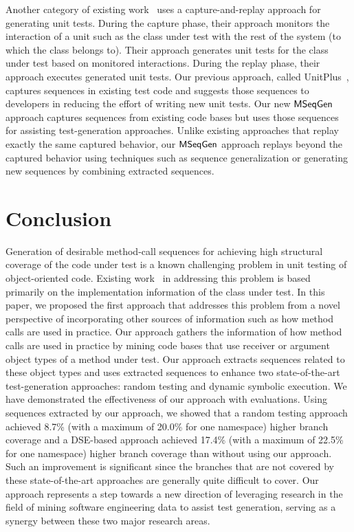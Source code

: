 \documentclass{sig-alternate}
\begin{document}
Another category of existing work~\cite{Elbaum:capture, orso:capture, david:java} uses a capture-and-replay approach for generating unit tests. During the capture phase, their approach monitors the interaction of a unit such as the class under test with the rest of the system (to which the class belongs to). Their approach generates unit tests for the class under test based on monitored interactions. During the replay phase, their approach executes generated unit tests. Our previous approach, called UnitPlus~\cite{song07:unitplus}, captures sequences in existing test code and suggests those sequences to developers in reducing the effort of writing new unit tests. Our new $\textsf{MSeqGen} $ approach captures sequences from existing code bases but uses those sequences for assisting test-generation approaches. Unlike existing approaches that replay exactly the same captured behavior, our $\textsf{MSeqGen} $ approach replays beyond the captured behavior using techniques such as sequence generalization or generating new sequences by combining extracted sequences. 

\section{Conclusion}
\label{sec:concl}

Generation of desirable method-call sequences for achieving high structural coverage of the code under test is a known challenging problem in unit testing of object-oriented code. Existing work~\cite{csallner:jcrasher, khurshid:symbolic, xie:rostra} in addressing this problem is based primarily on the implementation information of the class under test. In this paper, we proposed the first approach that addresses this problem from a novel perspective of incorporating other sources of information such as how method calls are used in practice. Our approach gathers the information of how method calls are used in practice by mining code bases that use receiver or argument object types of a method under test. Our approach extracts sequences related to these object types and uses extracted sequences to enhance two state-of-the-art test-generation approaches: random testing and dynamic symbolic execution. We have demonstrated the effectiveness of our approach with  evaluations. Using sequences extracted by our approach, we showed that a random testing approach achieved 8.7\% (with a maximum of 20.0\% for one namespace) higher branch coverage and a DSE-based approach achieved 17.4\% (with a maximum of 22.5\% for one namespace) higher branch coverage than without using our approach. Such an improvement is significant since the branches that are not covered by these state-of-the-art approaches are generally quite difficult to cover. Our approach represents a step towards a new direction of leveraging research in the field of mining software engineering data to assist test generation, serving as a synergy between these two major research areas.
\end{document}
